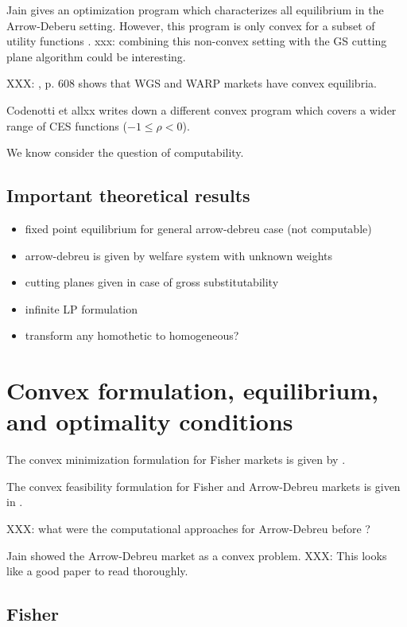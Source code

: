 \documentclass{article}
\begin{document}
Jain \cite{jain2007polynomial} gives an optimization program which characterizes all equilibrium in the Arrow-Deberu setting. However, this program is only convex for a subset of utility functions \cite{chen2010equilibrium}. xxx: combining this non-convex setting with the GS cutting plane algorithm could be interesting.

XXX: \cite{mas1995microeconomic}, p. 608 shows that WGS and WARP markets have convex equilibria.

Codenotti et allxx \cite{codenotti2005market} writes down a different convex program which covers a wider range of CES functions ($-1 \leq \rho < 0$).

We know consider the question of computability.

\subsection{Important theoretical results}
\begin{itemize}
\item fixed point equilibrium for general arrow-debreu case (not computable)
\item arrow-debreu is given by welfare system with unknown weights
\item cutting planes given in case of gross substitutability
\item infinite LP formulation
\item transform any homothetic to homogeneous?
\end{itemize}


\section{Convex formulation, equilibrium, and optimality conditions}
The convex minimization formulation for Fisher markets is given by \cite{eisenberg1961aggregation}.

The convex feasibility formulation for Fisher and Arrow-Debreu markets is given in \cite{chen2010equilibrium}.

XXX: what were the computational approaches for Arrow-Debreu before \cite{chen2010equilibrium}?

Jain \cite{jain2007polynomial} showed the Arrow-Debreu market as a convex problem.
XXX: This looks like a good paper to read thoroughly. 

\subsection{Fisher}
\end{document}

